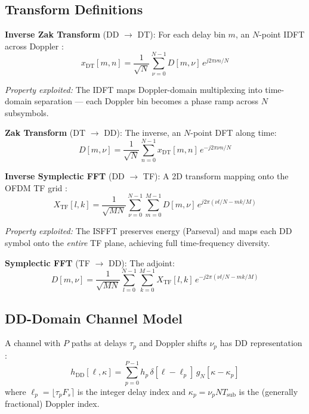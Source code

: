 \documentclass[11pt,a4paper,twoside]{article}
\begin{document}
\subsection{Transform Definitions}

\textbf{Inverse Zak Transform} (DD $\to$ DT): For each delay bin $m$, an $N$-point IDFT across Doppler \cite{hadani2017}:
\begin{equation}
    x_{\text{DT}}[m, n] = \frac{1}{\sqrt{N}} \sum_{\nu=0}^{N-1} D[m, \nu] \, e^{j2\pi \nu n / N}
    \label{eq:inv_zak2}
\end{equation}

\textit{Property exploited:} The IDFT maps Doppler-domain multiplexing into time-domain separation --- each Doppler bin becomes a phase ramp across $N$ subsymbols.

\textbf{Zak Transform} (DT $\to$ DD): The inverse, an $N$-point DFT along time:
\begin{equation}
    D[m, \nu] = \frac{1}{\sqrt{N}} \sum_{n=0}^{N-1} x_{\text{DT}}[m, n] \, e^{-j2\pi \nu n / N}
    \label{eq:zak2}
\end{equation}

\textbf{Inverse Symplectic FFT} (DD $\to$ TF): A 2D transform mapping onto the OFDM TF grid \cite{hadani2017}:
\begin{equation}
    X_{\text{TF}}[l, k] = \frac{1}{\sqrt{MN}} \sum_{\nu=0}^{N-1} \sum_{m=0}^{M-1} D[m,\nu] \, e^{j2\pi(\nu l/N - mk/M)}
    \label{eq:isfft2}
\end{equation}

\textit{Property exploited:} The ISFFT preserves energy (Parseval) and maps each DD symbol onto the \emph{entire} TF plane, achieving full time-frequency diversity.

\textbf{Symplectic FFT} (TF $\to$ DD): The adjoint:
\begin{equation}
    D[m, \nu] = \frac{1}{\sqrt{MN}} \sum_{l=0}^{N-1} \sum_{k=0}^{M-1} X_{\text{TF}}[l,k] \, e^{-j2\pi(\nu l/N - mk/M)}
    \label{eq:sfft2}
\end{equation}

\subsection{DD-Domain Channel Model}

A channel with $P$ paths at delays $\tau_p$ and Doppler shifts $\nu_p$ has DD representation \cite{raviteja2019}:
\begin{equation}
    h_{\text{DD}}[\ell, \kappa] = \sum_{p=0}^{P-1} h_p \, \delta[\ell - \ell_p] \, g_N[\kappa - \kappa_p]
\end{equation}
where $\ell_p = \lfloor \tau_p F_s \rceil$ is the integer delay index and $\kappa_p = \nu_p N T_{\text{sub}}$ is the (generally fractional) Doppler index.
\end{document}
